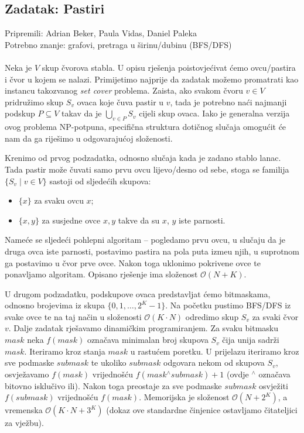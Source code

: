 \subsection*{Zadatak: Pastiri}
\textsf{Pripremili: Adrian Beker, Paula Vidas, Daniel Paleka}\\
\textsf{Potrebno znanje: grafovi, pretraga u širinu/dubinu (BFS/DFS)}
\\\\
Neka je $V$ skup čvorova stabla. U opisu rješenja poistovjećivat ćemo
ovcu/pastira i čvor u kojem se nalazi. Primijetimo najprije da zadatak možemo
promatrati kao instancu takozvanog \textit{set cover} problema. Zaista, ako
svakom čvoru $v \in V$ pridružimo skup $S_v$ ovaca koje čuva pastir u $v$, tada
je potrebno naći najmanji podskup $P \subseteq V$ takav da je $\bigcup_{v \in
P} S_v$ cijeli skup ovaca. Iako je generalna verzija ovog problema NP-potpuna,
specifična struktura dotičnog slučaja omogućit će nam da ga riješimo u
odgovarajućoj složenosti.

Krenimo od prvog podzadatka, odnosno slučaja kada je zadano stablo lanac. Tada
pastir može čuvati samo prvu ovcu lijevo/desno od sebe, stoga se familija
$\{S_v \mid v \in V\}$ sastoji od sljedećih skupova:
\begin{itemize}
    \item $\{x\}$ za svaku ovcu $x$;
    \item $\{x, y\}$ za susjedne ovce $x, y$ takve da su $x$, $y$ iste parnosti.
\end{itemize}
Nameće se sljedeći pohlepni algoritam -- pogledamo prvu ovcu, u slučaju da je
druga ovca iste parnosti, postavimo pastira na pola puta izme\dj u njih, u
suprotnom ga postavimo u čvor prve ovce. Nakon toga uklonimo pokrivene ovce te
ponavljamo algoritam. Opisano rješenje ima složenost $\mathcal{O}(N + K)$.

U drugom podzadatku, podskupove ovaca predstavljat ćemo bitmaskama, odnosno
brojevima iz skupa $\{0, 1, \ldots, 2^K-1\}$. Na početku pustimo BFS/DFS iz
svake ovce te na taj način u složenosti $\mathcal{O}(K \cdot N)$ odredimo skup
$S_v$ za svaki čvor $v$. Dalje zadatak rješavamo dinamičkim programiranjem. Za
svaku bitmasku $mask$ neka $f(mask)$ označava minimalan broj skupova $S_v$ čija
unija sadrži $mask$. Iteriramo kroz stanja $mask$ u rastućem poretku. U
prijelazu iteriramo kroz sve podmaske $submask$ te ukoliko $submask$ odgovara
nekom od skupova $S_v$, osvježavamo $f(mask)$ vrijednošću $f(mask
\mathbin{^\wedge} submask) + 1$ (ovdje $^\wedge$ označava bitovno isklučivo
ili). Nakon toga preostaje za sve podmaske $submask$ osvježiti $f(submask)$
vrijednošću $f(mask)$. Memorijska je složenost $\mathcal{O}(N + 2^K)$, a
vremenska $\mathcal{O}(K \cdot N + 3^K)$ (dokaz ove standardne činjenice
ostavljamo čitateljici za vježbu).

